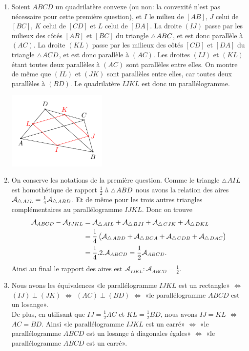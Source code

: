 \documentclass[a4paper,12pt,reqno]{amsart}
\begin{document}
\begin{solution}

  \begin{enumerate}
    \item Soient $ABCD$ un quadrilatère convexe (ou non: la convexité n'est pas nécessaire pour cette première question), et $I$ le milieu de $[AB]$, $J$ celui de $[BC]$, $K$ celui de $[CD]$ et $L$ celui de $[DA]$. La droite $(IJ)$ passe par les milieux des côtés $[AB]$ et $[BC]$ du triangle $\tri ABC$, et est donc parallèle à $(AC)$. La droite $(KL)$ passe par les milieux des côtés $[CD]$ et $[DA]$ du triangle $\tri ACD$, et est donc parallèle à $(AC)$. Les droites $(IJ)$ et $(KL)$ étant toutes deux parallèles à $(AC)$ sont parallèles entre elles. On montre de même que $(IL)$ et $(JK)$ sont parallèles entre elles, car toutes deux parallèles à $(BD)$. Le quadrilatère $IJKL$ est donc un parallélogramme.
    \begin{center}
      \includegraphics[width=4.9cm]{M67_2018-19_DS2_img_quadrilatere_milieux}
    \end{center}
    \item On conserve les notations de la première question. Comme le triangle $\tri AIL$ est homothétique de rapport $\frac{1}{2}$ à $\tri ABD$ nous avons la relation des aires $\mathcal{A}_{\tri AIL} = \frac{1}{4} \mathcal{A}_{\tri ABD}$. Et de même pour les trois autres triangles complémentaires au parallélogramme $IJKL$. Donc on trouve
    \begin{align*}
      \mathcal{A}_{ABCD} - \mathcal{A}_{IJKL}
        & = \mathcal{A}_{\tri AIL} + \mathcal{A}_{\tri BJI} + \mathcal{A}_{\tri CJK} + \mathcal{A}_{\tri DKL} \\
        & = \frac{1}{4}\left( \mathcal{A}_{\tri ABD} + \mathcal{A}_{\tri BCA} + \mathcal{A}_{\tri CDB} + \mathcal{A}_{\tri DAC} \right)\\
        &  = \frac{1}{4}.2.\mathcal{A}_{ABCD} = \frac{1}{2}\mathcal{A}_{ABCD}.
    \end{align*}
    Ainsi au final le rapport des aires est $\mathcal{A}_{IJKL}:\mathcal{A}_{ABCD} = \frac{1}{2}$.
    \item Nous avons les équivalences «le parallélogramme $IJKL$ est un rectangle» $\Leftrightarrow$ $(IJ) \perp (JK)$ $\Leftrightarrow$ $(AC) \perp (BD)$ $\Leftrightarrow$ «le parallélogramme $ABCD$ est un losange».\\
    De plus, en utilisant que $IJ=\frac{1}{2}AC$ et $KL=\frac{1}{2}BD$, nous avons $IJ=KL$ $\Leftrightarrow$ $AC=BD$. Ainsi «le parallélogramme $IJKL$ est un carré» $\Leftrightarrow$ «le parallélogramme $ABCD$ est un losange à diagonales égales» $\Leftrightarrow$ «le parallélogramme $ABCD$ est un carré».
  \end{enumerate}
\end{solution}
\end{document}
